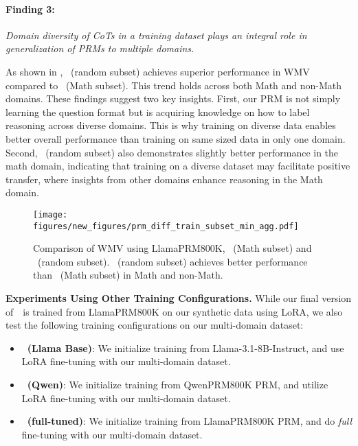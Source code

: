 \begin{highlight}
    \paragraph{Finding 3:} 
    \emph{Domain diversity of CoTs in a training dataset plays an integral role in generalization of PRMs to multiple domains.}
\end{highlight}

As shown in , \ourprm~(random subset) achieves superior performance in WMV compared to \ourprm~(Math subset).
This trend holds across both Math and non-Math domains. These findings suggest two key insights.
First, our PRM is not simply learning the question format but is acquiring knowledge on how to label reasoning across diverse domains. This is why training on diverse data enables better overall performance than training on same sized data in only one domain. Second, \ourprm~(random subset) also demonstrates slightly better performance in the math domain, indicating that training on a diverse dataset may facilitate positive transfer, where insights from other domains enhance reasoning in the Math domain.



\begin{figure}[t]
    \centering
    \texttt{[image: figures/new\_figures/prm\_diff\_train\_subset\_min\_agg.pdf]}
    \caption{Comparison of WMV using LlamaPRM800K, \ourprm~(Math subset) and \ourprm~(random subset). \ourprm~(random subset) achieves better performance than \ourprm~(Math subset) in Math and non-Math.}
    \label{fig:prm-ablation}
    \vskip -0.2in
\end{figure}



\textbf{Experiments Using Other Training Configurations.}
While our final version of~\ourprm~is trained from LlamaPRM800K on our synthetic data using LoRA, we also test the following training configurations on our multi-domain dataset:
\begin{itemize}[leftmargin=10px]

    \item \textbf{\ourprm~(Llama Base)}: We initialize training from Llama-3.1-8B-Instruct, and use LoRA fine-tuning with our multi-domain dataset.

    \item \textbf{\ourprm~(Qwen)}: We initialize training from QwenPRM800K PRM, and utilize LoRA fine-tuning with our multi-domain dataset.

    \item \textbf{\ourprm~(full-tuned)}: We initialize training from LlamaPRM800K PRM, and do \emph{full} fine-tuning with our multi-domain dataset.

\end{itemize}

